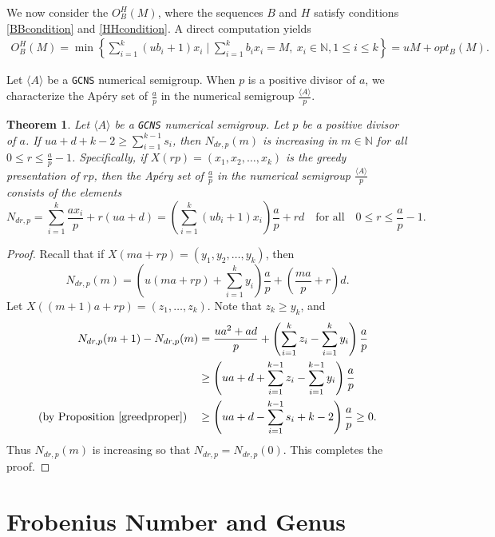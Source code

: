 \documentclass[reqno, 12pt]{article}
\newtheorem{thm}{Theorem}[section]
\theoremstyle{mydefinition}
\theoremstyle{myremark}
\numberwithin{algorithm}{section}
\begin{document}
We now consider the $O_B^H(M)$, where the sequences $B$ and $H$ satisfy conditions \eqref{BBcondition} and \eqref{HHcondition}.
A direct computation yields 
\begin{align*}
O_{B}^{H}(M)=\min\left\{\sum_{i=1}^k(ub_i+1)x_i \mid \sum_{i=1}^k b_ix_i=M, \ x_i\in\mathbb{N}, 1\leq i\leq k\right\}
=uM+opt_B(M).
\end{align*}

Let $\langle A\rangle$ be a \texttt{GCNS} numerical semigroup. When $p$ is a positive divisor of $a$, we characterize the Ap\'ery set of $\frac{a}{p}$ in the numerical semigroup $\frac{\langle A\rangle}{p}$.


\begin{thm}\label{HBuadNDr}
Let $\langle A\rangle$ be a \texttt{GCNS} numerical semigroup. Let $p$ be a positive divisor of $a$.
If $ua+d+k-2\geq \sum_{i=1}^{k-1}s_i$, then $N_{dr,p}(m)$ is increasing in $m\in \mathbb{N}$ for all $0\leq r\leq \frac{a}{p}-1$. Specifically, if $X(rp)=(x_1,x_2,\ldots,x_k)$ is the greedy presentation of $rp$, then the Ap\'ery set of $\frac{a}{p}$ in the numerical semigroup $\frac{\langle A\rangle}{p}$ consists of the elements
\begin{equation}\label{Ndr-pre}
N_{dr,p}=\sum_{i=1}^k \frac{a x_i }{p}+r(ua+d)=\left(\sum_{i=1}^k(ub_i+1)x_i\right)\frac{a}{p}+rd
\quad \text{for all}\quad 0\leq r\leq \frac{a}{p}-1.
\end{equation}
\end{thm}
\begin{proof}
Recall that if $X(ma+rp)=(y_1,y_2,\ldots,y_k)$, then
$$N_{dr,p}(m)=\left(u(ma+rp)+\sum_{i=1}^k y_i\right)\frac{a}{p}+\left(\frac{ma}{p}+r\right)d.$$
Let $X((m+1)a+rp)=(z_1,\ldots,z_k)$. Note that $z_{k}\geq y_k$, and
\begin{align*}
N_{dr,p}(m+1)-N_{dr,p}(m)&=\frac{ua^2+ad}{p}+\left(\sum_{i=1}^k z_i-\sum_{i=1}^k y_i\right)\frac{a}{p}
\\& \geq\left(ua+d+\sum_{i=1}^{k-1}z_i-\sum_{i=1}^{k-1}y_i\right)\frac{a}{p}
\\(\textrm{by\ Proposition\ \ref{greedproper}})\quad  & \geq\left(ua+d-\sum_{i=1}^{k-1}s_i+k-2\right)\frac{a}{p}\geq 0.
\end{align*}
Thus $N_{dr,p}(m)$ is increasing so that $N_{dr,p}=N_{dr,p}(0)$. This completes the proof.
\end{proof}




\section{Frobenius Number and Genus}\label{Section-3}
\end{document}

